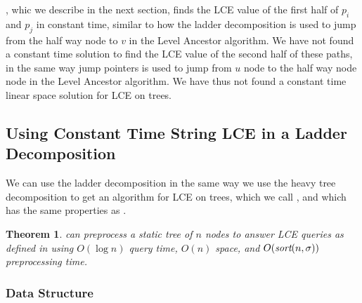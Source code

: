 \documentclass[a4]{article}
\newcommand*{\pref}{\prettyref}
\newtheorem{theorem}{Theorem}
\begin{document}
, whic we describe in the next section, finds the LCE value of the first half of $p_i$ and $p_j$ in constant time, similar to how the ladder decomposition is used to jump from the half way node to $v$ in the Level Ancestor algorithm. We have not found a constant time solution to find the LCE value of the second half of these paths, in the same way jump pointers is used to jump from $u$ node to the half way node node in the Level Ancestor algorithm. We have thus not found a constant time linear space solution for LCE on trees.

\subsection{Using Constant Time String LCE in a Ladder Decomposition}

We can use the ladder decomposition in the same way we use the heavy tree decomposition to get an algorithm for LCE on trees, which we call , and which has the same properties as .

\begin{theorem}
 can preprocess a static tree of $n$ nodes to answer LCE queries as defined in \pref{sec:tree-def} using $O(\log n)$ query time, $O(n)$ space, and $O(\textit{sort}(n,\sigma))$ preprocessing time.
\end{theorem}

\subsubsection{Data Structure}
\end{document}
